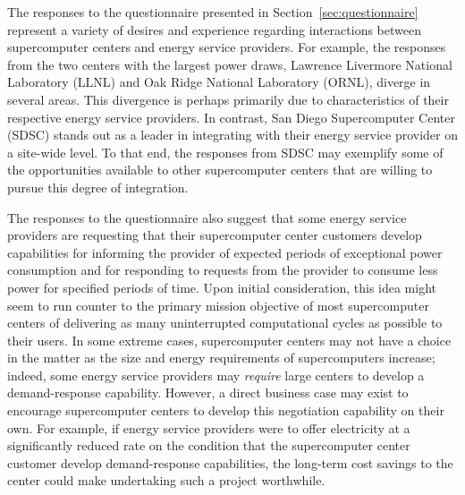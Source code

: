 The responses to the questionnaire presented in
Section~\ref{sec:questionnaire} represent a variety of desires and
experience regarding interactions between supercomputer centers and
energy service providers.  For example, the responses from the two centers
with the largest power draws, Lawrence Livermore National Laboratory
(LLNL) and Oak Ridge National Laboratory (ORNL), diverge in several
areas.  This divergence is perhaps primarily due to characteristics of
their respective energy service providers.  In contrast, San Diego
Supercomputer Center (SDSC) stands out as a leader in integrating
with their energy service provider on a site-wide level.  To that end, the
responses from SDSC may exemplify some of the opportunities available
to other supercomputer centers that are willing to pursue this degree
of integration.


The responses to the questionnaire also suggest that some energy service
providers are requesting that their supercomputer center customers
develop capabilities for informing the provider of expected periods of
exceptional power consumption and for responding to requests from the
provider to consume less power for specified periods of time.  Upon
initial consideration, this idea might seem to run counter to the
primary mission objective of most supercomputer centers of delivering
as many uninterrupted computational cycles as possible to their users.
In some extreme cases, supercomputer centers may not have a choice
in the matter as the size and energy requirements of supercomputers
increase; indeed, some energy service providers may \textit{require} large
centers to develop a demand-response capability.  However, a direct
business case may exist to encourage supercomputer centers to develop
this negotiation capability on their own.  For example, if energy service
providers were to offer electricity at a significantly reduced rate
on the condition that the supercomputer center customer develop
demand-response capabilities, the long-term cost savings to the
center could make undertaking such a project worthwhile.

